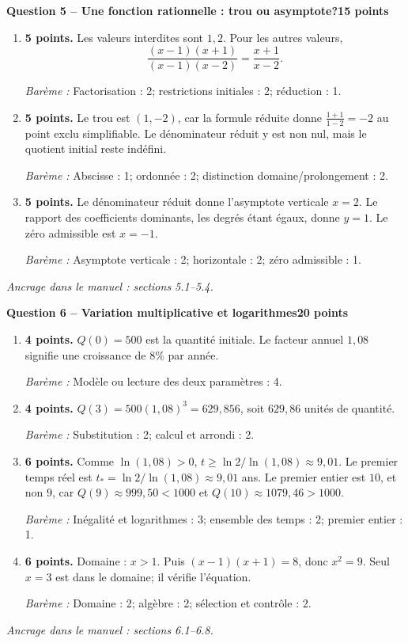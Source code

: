 \documentclass[11pt,a4paper]{article}
\begin{document}
\newpage
{\large\bfseries Question 5 -- Une fonction rationnelle : trou ou asymptote?}\hfill\textbf{15 points}\par
\begin{enumerate}
\item \textbf{5 points.} Les valeurs interdites sont \(1,2\). Pour les autres valeurs, \[\frac{(x-1)(x+1)}{(x-1)(x-2)}=\frac{x+1}{x-2}.\]
\par{\small\textit{Barème : }Factorisation : 2; restrictions initiales : 2; réduction : 1.}
\item \textbf{5 points.} Le trou est \((1,-2)\), car la formule réduite donne \(\frac{1+1}{1-2}=-2\) au point exclu simplifiable. Le dénominateur réduit y est non nul, mais le quotient initial reste indéfini.
\par{\small\textit{Barème : }Abscisse : 1; ordonnée : 2; distinction domaine/prolongement : 2.}
\item \textbf{5 points.} Le dénominateur réduit donne l’asymptote verticale \(x=2\). Le rapport des coefficients dominants, les degrés étant égaux, donne \(y=1\). Le zéro admissible est \(x=-1\).
\par{\small\textit{Barème : }Asymptote verticale : 2; horizontale : 2; zéro admissible : 1.}
\end{enumerate}
\vfill {\small\textit{Ancrage dans le manuel : sections 5.1--5.4.}}

\newpage
{\large\bfseries Question 6 -- Variation multiplicative et logarithmes}\hfill\textbf{20 points}\par
\begin{enumerate}
\item \textbf{4 points.} \(Q(0)=500\) est la quantité initiale. Le facteur annuel \(1{,}08\) signifie une croissance de \(8\%\) par année.
\par{\small\textit{Barème : }Modèle ou lecture des deux paramètres : 4.}
\item \textbf{4 points.} \(Q(3)=500(1{,}08)^3=629{,}856\), soit \(629{,}86\) unités de quantité.
\par{\small\textit{Barème : }Substitution : 2; calcul et arrondi : 2.}
\item \textbf{6 points.} Comme \(\ln(1{,}08)>0\), \(t\ge\ln2/\ln(1{,}08)\approx9{,}01\). Le premier temps réel est \(t_*=\ln2/\ln(1{,}08)\approx9{,}01\) ans. Le premier entier est \(10\), et non \(9\), car \(Q(9)\approx999{,}50<1000\) et \(Q(10)\approx1079{,}46>1000\).
\par{\small\textit{Barème : }Inégalité et logarithmes : 3; ensemble des temps : 2; premier entier : 1.}
\item \textbf{6 points.} Domaine : \(x>1\). Puis \((x-1)(x+1)=8\), donc \(x^2=9\). Seul \(x=3\) est dans le domaine; il vérifie l’équation.
\par{\small\textit{Barème : }Domaine : 2; algèbre : 2; sélection et contrôle : 2.}
\end{enumerate}
\vfill {\small\textit{Ancrage dans le manuel : sections 6.1--6.8.}}
\end{document}

